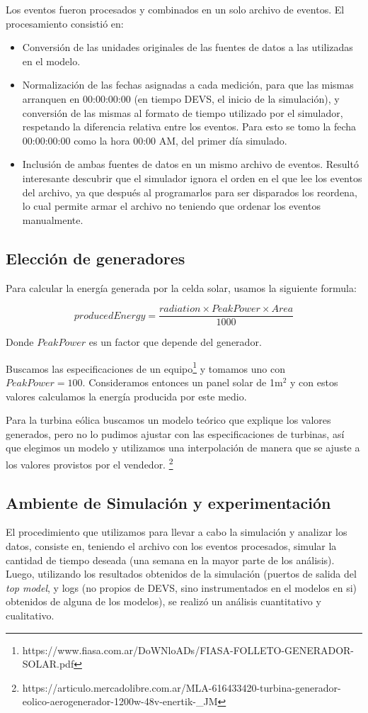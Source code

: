 Los eventos fueron procesados y combinados en un solo archivo de eventos. El
procesamiento consistió en: 
\begin{itemize} 
    \item Conversión de las unidades originales de las fuentes de datos a las
    utilizadas en el modelo.
    \item Normalización de las fechas asignadas a cada medición, para que las
    mismas arranquen en 00:00:00:00 (en tiempo DEVS, el inicio de la
    simulación), y conversión de las mismas al formato de tiempo utilizado
    por el simulador, respetando la diferencia relativa entre los eventos.
    Para esto se tomo la fecha 00:00:00:00 como la hora 00:00 AM, del primer
    día simulado.
    \item Inclusión de ambas fuentes de datos en un mismo archivo de eventos.
    Resultó interesante descubrir que el simulador ignora el orden en el que
    lee los eventos del archivo, ya que después al programarlos para ser
    disparados los reordena, lo cual permite armar el archivo no teniendo que
    ordenar los eventos manualmente.
\end{itemize} %

\subsection{Elección de generadores}
Para calcular la energía generada por la celda solar, usamos la siguiente formula:

$$producedEnergy = \frac{radiation \times PeakPower \times Area}{1000}$$

Donde $PeakPower$ es un factor que depende del generador.

Buscamos las especificaciones de un equipo\footnote{https://www.fiasa.com.ar/DoWNloADs/FIASA-FOLLETO-GENERADOR-SOLAR.pdf}  
y tomamos uno con $PeakPower=100$. Consideramos entonces un panel solar de 1m$^2$ y con estos valores calculamos la
energía producida por este medio.

Para la turbina eólica buscamos un modelo teórico que explique los valores generados,
pero no lo pudimos ajustar con las especificaciones de turbinas, así que elegimos un
modelo y utilizamos una interpolación de manera que se ajuste a los valores 
provistos por el vendedor. \footnote{https://articulo.mercadolibre.com.ar/MLA-616433420-turbina-generador-eolico-aerogenerador-1200w-48v-enertik-\_JM}

\subsection{Ambiente de Simulación y experimentación} 
El procedimiento que utilizamos para llevar a cabo la simulación y analizar
los datos, consiste en, teniendo el archivo con los eventos procesados,
simular la cantidad de tiempo deseada (una semana en la mayor parte de los
análisis). Luego, utilizando los resultados obtenidos de la simulación
(puertos de salida del \textit{top model}, y logs (no propios de DEVS, sino
instrumentados en el modelos en si) obtenidos de alguna de los modelos), se
realizó un análisis cuantitativo y cualitativo.

